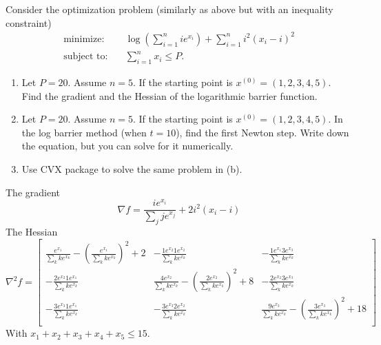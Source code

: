 \documentclass[11pt]{article}
\begin{document}
\pagebreak

\begin{homeworkProblem}

    Consider the optimization problem (similarly as above but with an inequality constraint)
    \begin{align*}
        \text{minimize:} \quad   & \log\left(\sum_{i=1}^{n} ie^{x_i}\right) + \sum_{i=1}^{n} i^2(x_i - i)^2 \\
        \text{subject to:} \quad & \sum_{i=1}^{n} x_i \leq P.
    \end{align*}
    \begin{enumerate}[label=(\alph*), topsep=5pt, itemsep=5pt]
        \item Let $P = 20$. Assume $n = 5$. If the starting point is $x^{(0)} = (1, 2, 3, 4, 5)$. Find the gradient
              and the Hessian of the logarithmic barrier function.
        \item Let $P = 20$. Assume $n = 5$. If the starting point is $x^{(0)} = (1, 2, 3, 4, 5)$. In the log barrier
              method (when $t = 10$), find the first Newton step. Write down the equation, but you
              can solve for it numerically.
        \item Use CVX package to solve the same problem in (b). \newline
    \end{enumerate}
    \solution

    The gradient
    \[
        \nabla f = \frac{ie^{x_i}}{\sum_{j} je^{x_j}}  + 2i^2(x_i - i)
    \]
    The Hessian
    \[
        \nabla^2 f = \begin{bmatrix}
            \frac{e^{x_1}}{\sum_{k} ke^{x_k}} - \left(\frac{e^{x_1}}{\sum_{k} ke^{x_k}}\right)^2 + 2 & -\frac{1e^{x_2}1e^{x_2}}{\sum_{k} ke^{x_k}}                                                & -\frac{1e^{x_1}3e^{x_3}}{\sum_{k} ke^{x_k}}                                                 \\
            -\frac{2e^{x_2}1e^{x_1}}{\sum_{k} ke^{x_k}}                                              & \frac{4e^{x_2}}{\sum_{k} ke^{x_k}} - \left(\frac{2e^{x_2}}{\sum_{k} ke^{x_k}}\right)^2 + 8 & -\frac{2e^{x_2}3e^{x_3}}{\sum_{k} ke^{x_k}}                                                 \\
            -\frac{3e^{x_3}1e^{x_1}}{\sum_{k} ke^{x_k}}                                              & -\frac{3e^{x_3}2e^{x_2}}{\sum_{k} ke^{x_k}}                                                & \frac{9e^{x_3}}{\sum_{k} ke^{x_k}} - \left(\frac{3e^{x_3}}{\sum_{k} ke^{x_k}}\right)^2 + 18 \\
        \end{bmatrix}
    \]
    With $x_1 + x_2 + x_3 + x_4 + x_5 \leq 15$.

\end{homeworkProblem}
\end{document}
